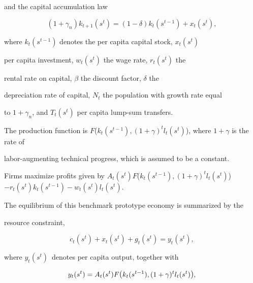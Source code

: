 \documentclass[fleqn,leqno,11pt]{article}
\begin{document}
and the capital accumulation law 

\begin{equation}

(1+\gamma _{n})k_{t+1}(s^{t})=(1-\delta )k_{t}(s^{t-1})+x_{t}(s^{t}),

\label{1}

\end{equation}%

where $k_{t}(s^{t-1})$ denotes the per capita capital stock, $x_{t}(s^{t})$

per capita investment, $w_{t}(s^{t})$ the wage rate, $r_{t}(s^{t})$ the

rental rate on capital, $\beta $ the discount factor, $\delta $ the

depreciation rate of capital, $N_{t}$ the population with growth rate equal

to $1+\gamma _{n}$, and $T_{t}(s^{t})$ per capita lump-sum transfers.



The production function is $F${\large (}$k_{t}(s^{t-1}),(1+\gamma

)^{t}l_{t}(s^{t})${\large )}, where $1+\gamma $ is the rate of

labor-augmenting technical progress, which is assumed to be a constant.

Firms maximize profits given by $A_{t}(s^{t})F${\large (}$%

k_{t}(s^{t-1}),(1+\gamma )^{t}l_{t}(s^{t})${\large )}$%

-r_{t}(s^{t})k_{t}(s^{t-1})-w_{t}(s^{t})l_{t}(s^{t})$.



The equilibrium of this benchmark prototype economy is summarized by the

resource constraint, 

\begin{equation}

c_{t}(s^{t})+x_{t}(s^{t})+g_{t}(s^{t})=y_{t}(s^{t}),  \label{resource}

\end{equation}%

where $y_{t}(s^{t})$\ denotes per capita output, together with 

\begin{equation}

y_{t}(s^{t})=A_{t}(s^{t})F\text{{\large (}}k_{t}(s^{t-1}),(1+\gamma

)^{t}l_{t}(s^{t})\text{{\large )}},  \label{AA}

\end{equation}%
\end{document}
